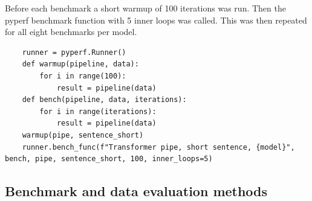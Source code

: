     Before each benchmark a short warmup of 100 iterations was run. Then the pyperf benchmark function with 5 inner loops was called. This was then repeated for all eight benchmarks per model.
    
    \begin{verbatim}
    runner = pyperf.Runner()
    def warmup(pipeline, data):
        for i in range(100):
            result = pipeline(data)
    def bench(pipeline, data, iterations):
        for i in range(iterations):
            result = pipeline(data)
    warmup(pipe, sentence_short)
    runner.bench_func(f"Transformer pipe, short sentence, {model}", bench, pipe, sentence_short, 100, inner_loops=5)
    \end{verbatim}
    


\subsection{Benchmark and data evaluation methods}

